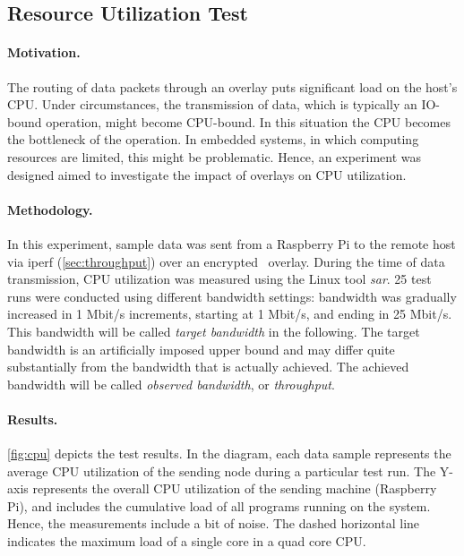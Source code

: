 \subsection{Resource Utilization Test} \label{sec:utilization}
\paragraph{Motivation.} The routing of data packets through an overlay puts significant load on the host's CPU. Under circumstances, the transmission of data, which is typically an IO-bound operation, might become CPU-bound. In this situation the CPU becomes the bottleneck of the operation. In embedded systems, in which computing resources are limited, this might be problematic. Hence, an experiment was designed aimed to investigate the impact of overlays on CPU utilization.

\paragraph{Methodology.} In this experiment, sample data was sent from a Raspberry Pi to the remote host via iperf (\cf \autoref{sec:throughput}) over an encrypted \wnet\ overlay. During the time of data transmission, CPU utilization was measured using the Linux tool \emph{sar}. 25 test runs were conducted using different bandwidth settings: bandwidth was gradually increased in 1 Mbit/s increments, starting at 1 Mbit/s, and ending in 25 Mbit/s. This bandwidth will be called \emph{target bandwidth} in the following. The target bandwidth is an artificially imposed upper bound and may differ quite substantially from the bandwidth that is actually achieved. The achieved bandwidth will be called \emph{observed bandwidth}, or \emph{throughput}.

\paragraph{Results.} 
\autoref{fig:cpu} depicts the test results. In the diagram, each data sample represents the average CPU utilization of the sending node during a particular test run. The Y-axis represents the overall CPU utilization of the sending machine (Raspberry Pi), and includes the cumulative load of all programs running on the system. Hence, the measurements include a bit of noise. The dashed horizontal line indicates the maximum load of a single core in a quad core CPU.

